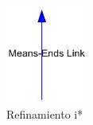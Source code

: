 \begin{itemize}
\begin{itemize}
\begin{figure}[h!]
                \includegraphics[scale=0.6]{media/imagenes/i_star/sintaxis/meansendslink.jpg}
                \caption{Refinamiento \gls{i*}}
            \end{figure}
        \end{itemize}
    \end{itemize}
